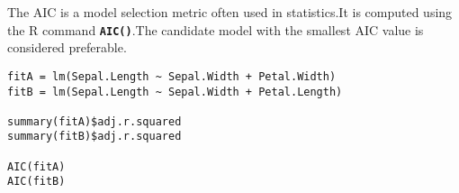 \documentclass[a4paper,12pt]{article}
\begin{document}
The AIC is a model selection metric often used in statistics.It is computed using the R command
\texttt{\textbf{AIC()}}.The candidate model with the smallest AIC value is considered preferable.

\begin{framed}
\begin{verbatim}
fitA = lm(Sepal.Length ~ Sepal.Width + Petal.Width)
fitB = lm(Sepal.Length ~ Sepal.Width + Petal.Length)

summary(fitA)$adj.r.squared
summary(fitB)$adj.r.squared

AIC(fitA)
AIC(fitB)
\end{verbatim}
\end{framed}

\end{document}
